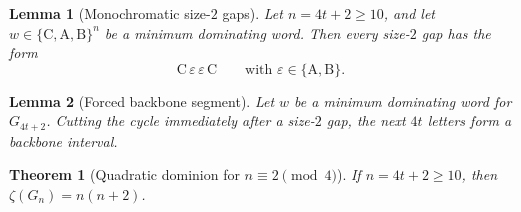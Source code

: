 \documentclass[10pt,a4paper]{amsart}
\newtheorem{lemma}{Lemma}
\newtheorem{theorem}{Theorem}
\newcommand{\colA}{\mathrm{A}}
\newcommand{\colB}{\mathrm{B}}
\newcommand{\colC}{\mathrm{C}}
\begin{document}
\begin{lemma}[Monochromatic size-$2$ gaps]\label{lem:mod2-gap-mono}
Let $n=4t+2\ge10$, and let $w\in\{\colC,\colA,\colB\}^n$ be a minimum dominating word.
Then every size-$2$ gap has the form
\[
\colC\,\varepsilon\,\varepsilon\,\colC
\qquad\text{with }\varepsilon\in\{\colA,\colB\}.
\]
\end{lemma}

\begin{lemma}[Forced backbone segment]\label{lem:mod2-backbone}
Let $w$ be a minimum dominating word for $G_{4t+2}$.  Cutting the cycle immediately after
a size-$2$ gap, the next $4t$ letters form a backbone interval.
\end{lemma}

\begin{theorem}[Quadratic dominion for $n\equiv 2\pmod4$]\label{thm:mod2-quadratic}
If $n=4t+2\ge10$, then $\zeta(G_n)=n(n+2)$.
\end{theorem}
\end{document}

